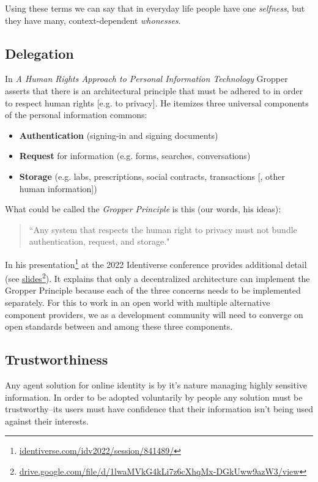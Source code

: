 \documentclass[11pt, oneside]{article}   	%
\newcommand{\hyperfootnote}[1][]{\def\ArgI{{#1}}\hyperfootnoteRelay}
\newcommand\hyperfootnoteRelay[2][]{\href{#1#2}{\ArgI}\footnote{\href{#1#2}{#2}}}
\begin{document}
Using these terms we can say that in everyday life people have one \emph{selfness}, but they have many, context-dependent \emph{whonesses}. 

\subsection{Delegation}

In \emph{A Human Rights Approach to Personal Information Technology}\cite{Gropper2022} Gropper asserts that there is an architectural principle that must be adhered to in order to respect human rights [e.g. to privacy]. He itemizes three universal components of the personal information commons:

\begin{itemize}
\item \textbf{Authentication} (signing-in and signing documents)
\item \textbf{Request} for information (e.g. forms, searches, conversations)
\item \textbf{Storage} (e.g. labs, prescriptions, social contracts, transactions [, other human information])
\end{itemize}

What could be called the \emph{Gropper Principle} is this (our words, his ideas):
\begin{quote}
``Any system that respects the human right to privacy must not bundle authentication, request, and storage."
\end{quote}

In his presentation\hyperfootnote[][https://]{identiverse.com/idv2022/session/841489/} at the 2022 Identiverse conference provides additional detail (see \hyperfootnote[slides][https://]{drive.google.com/file/d/1lwaMVkG4kLi7z6cXhqMx-DGkUww9azW3/view}). It explains that only a decentralized architecture can implement the Gropper Principle because each of the three concerns needs to be implemented separately. For this to work in an open world with multiple alternative component providers, we as a development community will need to converge on open standards between and among these three components. 

\subsection{Trustworthiness}

Any agent solution for online identity is by it's nature managing highly sensitive information. In order to be adopted voluntarily by people any solution must be trustworthy--its users must have confidence that their information isn't being used against their interests. 
\end{document}
